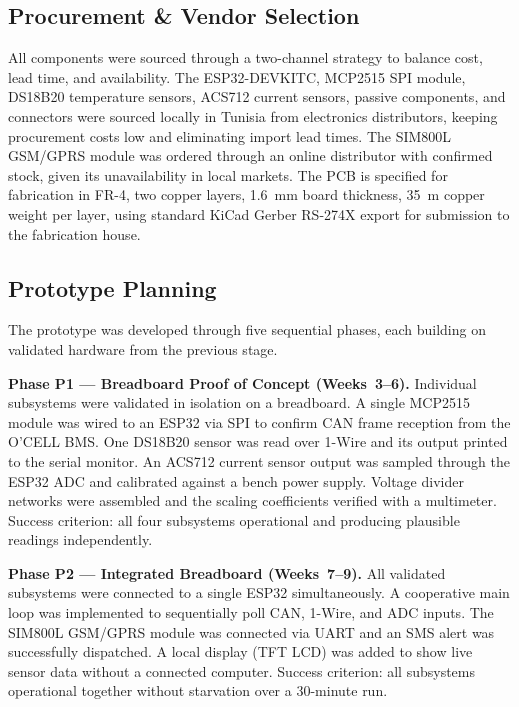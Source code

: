 \subsection{Procurement \& Vendor Selection}

All components were sourced through a two-channel strategy to balance cost, lead time, and availability. The ESP32-DEVKITC, MCP2515 SPI module, DS18B20 temperature sensors, ACS712 current sensors, passive components, and connectors were sourced locally in Tunisia from electronics distributors, keeping procurement costs low and eliminating import lead times. The SIM800L GSM/GPRS module was ordered through an online distributor with confirmed stock, given its unavailability in local markets. The PCB is specified for fabrication in FR-4, two copper layers, 1.6~mm board thickness, 35~\textmu m copper weight per layer, using standard KiCad Gerber RS-274X export for submission to the fabrication house.

\subsection{Prototype Planning}

The prototype was developed through five sequential phases, each building on validated hardware from the previous stage.

\textbf{Phase P1 --- Breadboard Proof of Concept (Weeks~3--6).}
Individual subsystems were validated in isolation on a breadboard. A single MCP2515 module was wired to an ESP32 via SPI to confirm CAN frame reception from the O'CELL BMS. One DS18B20 sensor was read over 1-Wire and its output printed to the serial monitor. An ACS712 current sensor output was sampled through the ESP32 ADC and calibrated against a bench power supply. Voltage divider networks were assembled and the scaling coefficients verified with a multimeter. Success criterion: all four subsystems operational and producing plausible readings independently.

\textbf{Phase P2 --- Integrated Breadboard (Weeks~7--9).}
All validated subsystems were connected to a single ESP32 simultaneously. A cooperative main loop was implemented to sequentially poll CAN, 1-Wire, and ADC inputs. The SIM800L GSM/GPRS module was connected via UART and an SMS alert was successfully dispatched. A local display (TFT LCD) was added to show live sensor data without a connected computer. Success criterion: all subsystems operational together without starvation over a 30-minute run.

